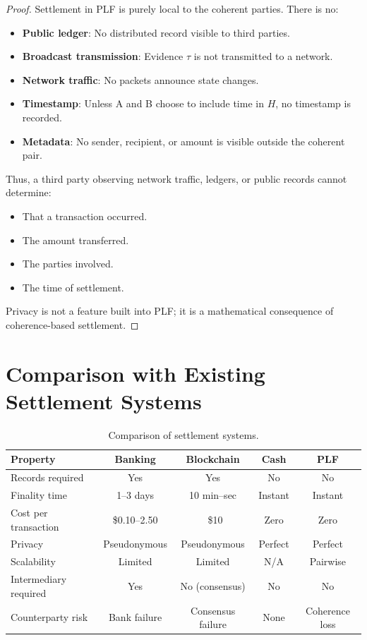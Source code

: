 \documentclass[twocolumn,10pt,a4paper]{article}
\theoremstyle{plain}
\theoremstyle{definition}
\begin{document}
\begin{proof}
Settlement in PLF is purely local to the coherent parties. There is no:
\begin{itemize}
\item \textbf{Public ledger}: No distributed record visible to third parties.
\item \textbf{Broadcast transmission}: Evidence $\tau$ is not transmitted to a network.
\item \textbf{Network traffic}: No packets announce state changes.
\item \textbf{Timestamp}: Unless A and B choose to include time in $H$, no timestamp is recorded.
\item \textbf{Metadata}: No sender, recipient, or amount is visible outside the coherent pair.
\end{itemize}

Thus, a third party observing network traffic, ledgers, or public records cannot determine:
\begin{itemize}
\item That a transaction occurred.
\item The amount transferred.
\item The parties involved.
\item The time of settlement.
\end{itemize}

Privacy is not a feature built into PLF; it is a mathematical consequence of coherence-based settlement.
\end{proof}

\section{Comparison with Existing Settlement Systems}
\label{sec:comparison}

\begin{table}[h]
\centering
\caption{Comparison of settlement systems.}
\begin{tabular}{lcccc}
\toprule
\textbf{Property} & \textbf{Banking} & \textbf{Blockchain} & \textbf{Cash} & \textbf{PLF} \\
\midrule
Records required & Yes & Yes & No & No \\
Finality time & 1--3 days & 10 min--sec & Instant & Instant \\
Cost per transaction & \$0.10--2.50 & ~\$10 & Zero & Zero \\
Privacy & Pseudonymous & Pseudonymous & Perfect & Perfect \\
Scalability & Limited & Limited & N/A & Pairwise \\
Intermediary required & Yes & No (consensus) & No & No \\
Counterparty risk & Bank failure & Consensus failure & None & Coherence loss \\
\bottomrule
\end{tabular}
\end{table}
\end{document}
